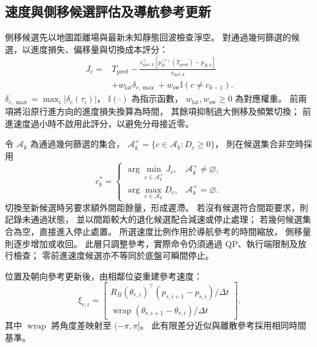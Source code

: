 \subsection{速度與側移候選評估及導航參考更新}
\label{subsec:candidate_reference_update}

側移候選先以地圖距離場與最新未知靜態回波檢查淨空。
對通過幾何篩選的候選，以進度損失、偏移量與切換成本評分：
\begin{equation}
    \begin{aligned}
        J_c={}&T_{\mathrm{pred}}
        -\frac{e_{\mathrm{nav},k}^\top
        [p_B^{(c)}(T_{\mathrm{pred}})-p_{B,0}]}
        {v_{\mathrm{nav},k}}\\
        &+w_{\mathrm{lat}}\delta_{c,\max}
        +w_{\mathrm{sw}}\mathbb I(c\ne c_{k-1}).
    \end{aligned}
    \label{eq:ch3_candidate_motion_cost}
\end{equation}
$\delta_{c,\max}=\max_i|\delta_c(\tau_i)|$，
$\mathbb I(\cdot)$ 為指示函數，
$w_{\mathrm{lat}},w_{\mathrm{sw}}\geq0$ 為對應權重。
前兩項將沿原行進方向的進度損失換算為時間，
其餘項抑制過大側移及頻繁切換；
前進速度過小時不啟用此評分，以避免分母接近零。

令 $\mathcal A_k$ 為通過幾何篩選的集合，
$\mathcal A_k^+=\{c\in\mathcal A_k:D_c\geq0\}$，
則在候選集合非空時採用
\begin{equation}
    c_k^*=
    \begin{cases}
        \displaystyle\arg\min_{c\in\mathcal A_k^+}J_c,
        &\mathcal A_k^+\ne\varnothing,\\[1mm]
        \displaystyle\arg\max_{c\in\mathcal A_k}D_c,
        &\mathcal A_k^+=\varnothing.
    \end{cases}
    \label{eq:ch3_candidate_selection_rule}
\end{equation}
切換至新候選時另要求額外間距餘量，形成遲滯。
若沒有候選符合間距要求，則記錄未通過狀態，
並以間距較大的退化候選配合減速或停止處理；
若幾何候選集合為空，直接進入停止處置。
所選速度比例作用於導航參考的時間縮放，
側移量則逐步增加或收回。
此層只調整參考，實際命令仍須通過 QP、執行端限制及放行檢查；
零前進速度候選亦不等同於底盤可瞬間停止。

位置及朝向參考更新後，由相鄰位姿重建參考速度：
\begin{equation}
    \xi_{r,i}=
    \begin{bmatrix}
        R_B(\theta_{r,i})^\top
        (p_{r,i+1}-p_{r,i})/\Delta t\\
        \operatorname{wrap}(\theta_{r,i+1}-\theta_{r,i})/\Delta t
    \end{bmatrix}.
    \label{eq:ch3_reference_velocity_reconstruction}
\end{equation}
其中 $\operatorname{wrap}$ 將角度差映射至 $(-\pi,\pi]$。
此有限差分近似與離散參考採用相同時間基準。

